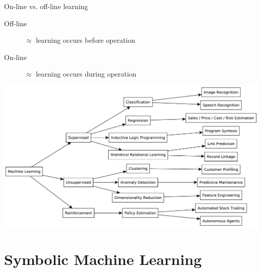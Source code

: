 \documentclass[presentation]{beamer}\mode<presentation>{\usetheme{AMSBolognaFC}}
\begin{document}
\begin{frame}[allowframebreaks]
    \begin{block}{On-line vs. off-line learning}
        \begin{description}
            \item[Off-line] $\approx$ learning occurs \alert{before} operation
            \item[On-line] $\approx$ learning occurs \alert{during} operation
        \end{description}
    \end{block}
    
    \begin{center}
        \includegraphics[width=.7\linewidth]{figures/ml-taxonomy.pdf}
    \end{center}
\end{frame}

\section{Symbolic Machine Learning}
\end{document}
